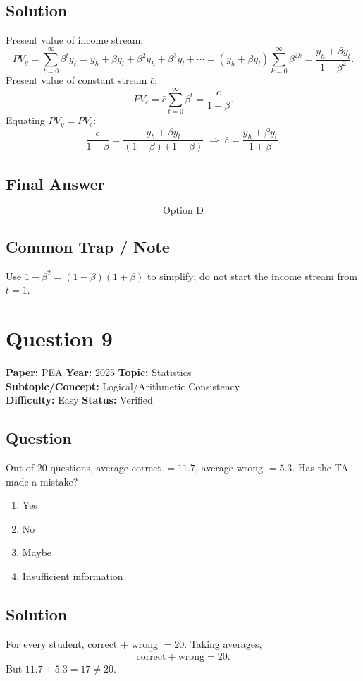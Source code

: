 \documentclass[11pt]{article}
\begin{document}
\subsection*{Solution}
Present value of income stream:
\[
PV_y = \sum_{t=0}^{\infty}\beta^t y_t
     = y_h + \beta y_l + \beta^2 y_h + \beta^3 y_l + \cdots
     = (y_h + \beta y_l)\sum_{k=0}^{\infty}\beta^{2k}
     = \frac{y_h + \beta y_l}{1 - \beta^2}.
\]
Present value of constant stream $\bar c$:
\[
PV_c = \bar c \sum_{t=0}^{\infty}\beta^t = \frac{\bar c}{1-\beta}.
\]
Equating $PV_y = PV_c$:
\[
\frac{\bar c}{1-\beta} = \frac{y_h + \beta y_l}{(1-\beta)(1+\beta)}
\;\Longrightarrow\;
\bar c = \frac{y_h + \beta y_l}{1+\beta}.
\]

\subsection*{Final Answer}
\[
\boxed{\text{Option D}}
\]

\subsection*{Common Trap / Note}
Use $1-\beta^2 = (1-\beta)(1+\beta)$ to simplify; do not start the income stream from $t=1$.

\section*{Question 9}
\textbf{Paper:} PEA \quad \textbf{Year:} 2025 \quad \textbf{Topic:} Statistics \\
\textbf{Subtopic/Concept:} Logical/Arithmetic Consistency \\
\textbf{Difficulty:} Easy \quad \textbf{Status:} Verified

\subsection*{Question}
Out of 20 questions, average correct $= 11.7$, average wrong $= 5.3$. Has the TA made a mistake?
\begin{enumerate}[label=(\Alph*)]
\item Yes \item No \item Maybe \item Insufficient information
\end{enumerate}

\subsection*{Solution}
For every student, correct $+$ wrong $= 20$. Taking averages,
\[
\overline{\text{correct}} + \overline{\text{wrong}} = 20.
\]
But $11.7 + 5.3 = 17 \ne 20$.
\end{document}
